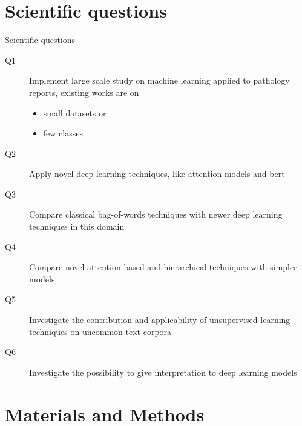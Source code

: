 \section{Scientific questions}

\begin{frame}{Scientific questions}
  \begin{description}
  \item[Q1] Implement \alert{large scale} study on machine learning
    applied to pathology reports, existing works are on
    \begin{itemize}
    \item \alert{small} datasets or
    \item \alert{few} classes
    \end{itemize}
  \item[Q2] Apply \alert{novel} deep learning techniques, like
    \alert{attention} models and \alert{\acs{bert}}
  \item[Q3] \alert{Compare} classical \alert{bag-of-words} techniques with
    newer deep learning techniques in this domain
  \item[Q4] \alert{Compare} novel \alert{attention}-based and
    \alert{hierarchical} techniques with simpler models
  \item[Q5] \alert{Investigate} the contribution and applicability of
    \alert{unsupervised} learning techniques on uncommon text corpora
  \item[Q6] \alert{Investigate} the possibility to give
    \alert{interpretation} to deep learning models
  \end{description}
\end{frame}


\section{Materials and Methods}

